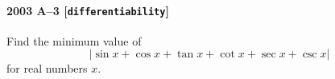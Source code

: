\paragraph{2003 A--3 \textnormal{[\texttt{differentiability}]}}
Find the minimum value of
\[
  | \sin x + \cos x + \tan x + \cot x + \sec x + \csc x |
\]
for real numbers $x$.
